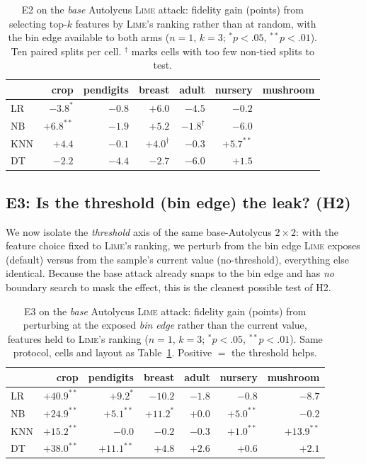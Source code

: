 \documentclass[sigconf,anonymous,review]{acmart}
\begin{document}
\begin{table}[t]
\centering
\caption{E2 on the \emph{base} Autolycus \textsc{Lime} attack: fidelity gain (points) from selecting top-$k$
features by \textsc{Lime}'s ranking rather than at random, with the bin edge available to both arms
($n{=}1$, $k{=}3$; $^{*}p{<}.05$, $^{**}p{<}.01$). Ten paired splits per cell. $^{\dag}$ marks cells
with too few non-tied splits to test.}
\label{tab:lime-attr}
\begin{tabular}{lrrrrrr}
\toprule
 & crop & pendigits & breast & adult & nursery & mushroom \\
\midrule
LR  & $-3.8^{*}$  & $-0.8$ & $+6.0$      & $-4.5$        & $-0.2$      & \\
NB  & $+6.8^{**}$ & $-1.9$ & $+5.2$      & $-1.8^{\dag}$ & $-6.0$      & \\
KNN & $+4.4$      & $-0.1$ & $+4.0^{\dag}$ & $-0.3$      & $+5.7^{**}$ & \\
DT  & $-2.2$      & $-4.4$ & $-2.7$      & $-6.0$        & $+1.5$      & \\
\bottomrule
\end{tabular}
\end{table}

\subsection{E3: Is the threshold (bin edge) the leak? (H2)}
\label{subsec:e3}
We now isolate the \emph{threshold} axis of the same base-Autolycus $2{\times}2$: with the feature
choice fixed to \textsc{Lime}'s ranking, we perturb from the bin edge \textsc{Lime} exposes (default)
versus from the sample's current value (no-threshold), everything else identical. Because the base
attack already snaps to the bin edge and has \emph{no} boundary search to mask the effect, this is
the cleanest possible test of H2.

\begin{table}[t]
\centering
\caption{E3 on the \emph{base} Autolycus \textsc{Lime} attack: fidelity gain (points) from perturbing at the
exposed \emph{bin edge} rather than the current value, features held to \textsc{Lime}'s ranking
($n{=}1$, $k{=}3$; $^{*}p{<}.05$, $^{**}p{<}.01$). Same protocol, cells and layout as
Table~\ref{tab:lime-attr}. Positive $=$ the threshold helps.}
\label{tab:lime-threshold}
\begin{tabular}{lrrrrrr}
\toprule
 & crop & pendigits & breast & adult & nursery & mushroom \\
\midrule
LR  & $+40.9^{**}$ & $+9.2^{*}$   & $-10.2$     & $-1.8$ & $-0.8$      & $-8.7$ \\
NB  & $+24.9^{**}$ & $+5.1^{**}$  & $+11.2^{*}$ & $+0.0$ & $+5.0^{**}$ & $-0.2$ \\
KNN & $+15.2^{**}$ & $-0.0$       & $-0.2$      & $-0.3$ & $+1.0^{**}$ & $+13.9^{**}$ \\
DT  & $+38.0^{**}$ & $+11.1^{**}$ & $+4.8$      & $+2.6$ & $+0.6$      & $+2.1$ \\
\bottomrule
\end{tabular}
\end{table}
\end{document}
